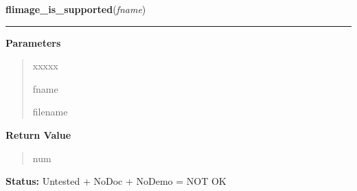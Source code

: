 \hspace{.8\funcindent}\begin{boxedminipage}{\funcwidth}

    \raggedright \textbf{flimage\_is\_supported}(\textit{fname})

    \vspace{-1.5ex}

    \rule{\textwidth}{0.5\fboxrule}
\setlength{\parskip}{2ex}
\setlength{\parskip}{1ex}
      \textbf{Parameters}
      \vspace{-1ex}

      \begin{quote}
        \begin{Ventry}{xxxxx}

          \item[fname]

          filename

        \end{Ventry}

      \end{quote}

      \textbf{Return Value}
    \vspace{-1ex}

      \begin{quote}
      num

      \end{quote}

\textbf{Status:} Untested + NoDoc + NoDemo = NOT OK



    \end{boxedminipage}

    \label{xformslib:library:flimage_description_via_filter}

    \vspace{0.5ex}

